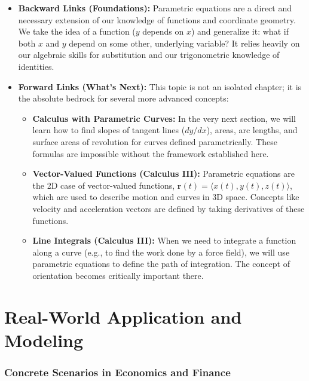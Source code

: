 \documentclass{article}
\begin{document}
\begin{itemize}
    \item \textbf{Backward Links (Foundations):} Parametric equations are a direct and necessary extension of our knowledge of functions and coordinate geometry. We take the idea of a function ($y$ depends on $x$) and generalize it: what if both $x$ and $y$ depend on some other, underlying variable? It relies heavily on our algebraic skills for substitution and our trigonometric knowledge of identities.

    \item \textbf{Forward Links (What's Next):} This topic is not an isolated chapter; it is the absolute bedrock for several more advanced concepts:
        \begin{itemize}
            \item \textbf{Calculus with Parametric Curves:} In the very next section, we will learn how to find slopes of tangent lines ($dy/dx$), areas, arc lengths, and surface areas of revolution for curves defined parametrically. These formulas are impossible without the framework established here.
            \item \textbf{Vector-Valued Functions (Calculus III):} Parametric equations are the 2D case of vector-valued functions, $\mathbf{r}(t) = \langle x(t), y(t), z(t) \rangle$, which are used to describe motion and curves in 3D space. Concepts like velocity and acceleration vectors are defined by taking derivatives of these functions.
            \item \textbf{Line Integrals (Calculus III):} When we need to integrate a function along a curve (e.g., to find the work done by a force field), we will use parametric equations to define the path of integration. The concept of orientation becomes critically important there.
        \end{itemize}
\end{itemize}

\part*{Real-World Application and Modeling}

\section{Concrete Scenarios in Economics and Finance}
\end{document}
